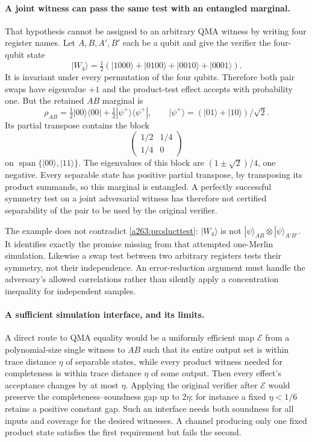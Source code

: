\documentclass[11pt]{article}
\begin{document}
\paragraph{A joint witness can pass the same test with an entangled marginal.}
That hypothesis cannot be assigned to an arbitrary QMA witness by
writing four register names. Let $A,B,A',B'$ each be a qubit and give
the verifier the four-qubit state
\[
 |W_4\rangle=\tfrac12
 (|1000\rangle+|0100\rangle+|0010\rangle+|0001\rangle).
\]
It is invariant under every permutation of the four qubits. Therefore
both pair swaps have eigenvalue $+1$ and the product-test effect accepts
with probability one. But the retained $AB$ marginal is
\[
 \rho_{AB}=\tfrac12|00\rangle\langle00|
              +\tfrac12|\psi^+\rangle\langle\psi^+|,
 \qquad |\psi^+\rangle=(|01\rangle+|10\rangle)/\sqrt2.
\]
Its partial transpose contains the block
\[
 \begin{pmatrix}1/2&1/4\\1/4&0\end{pmatrix}
\]
on $\operatorname{span}\{|00\rangle,|11\rangle\}$.
The eigenvalues of this block are $(1\pm\sqrt2)/4$, one negative.
Every separable state has positive partial transpose, by transposing
its product summands, so this marginal is entangled. A perfectly
successful symmetry test on a joint adversarial witness has therefore
not certified separability of the pair to be used by the original
verifier.

The example does not contradict \eqref{a263:producttest}: $|W_4\rangle$
is not $|\psi\rangle_{AB}\otimes|\psi\rangle_{A'B'}$. It identifies
exactly the promise missing from that attempted one-Merlin simulation.
Likewise a swap test between two arbitrary registers tests their
symmetry, not their independence. An error-reduction argument must
handle the adversary's allowed correlations rather than silently
apply a concentration inequality for independent samples.

\paragraph{A sufficient simulation interface, and its limits.}
A direct route to QMA equality would be a uniformly efficient map
$\mathcal E$ from a polynomial-size single witness to $AB$ such that
its entire output set is within trace distance $\eta$ of separable
states, while every product witness needed for completeness is within
trace distance $\eta$ of some output. Then every effect's acceptance
changes by at most $\eta$. Applying the original verifier after
$\mathcal E$ would preserve the completeness--soundness gap up to
$2\eta$; for instance a fixed $\eta<1/6$ retains a positive constant
gap. Such an interface needs both soundness for all inputs and coverage
for the desired witnesses. A channel producing only one fixed product
state satisfies the first requirement but fails the second.
\end{document}
